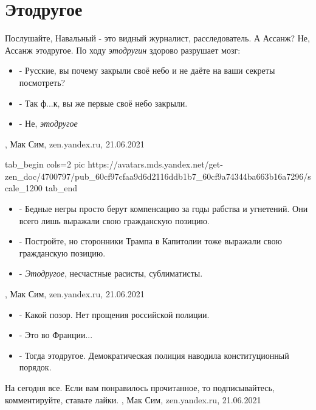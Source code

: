  
 
 
 
 
\chapter{Этодругое}
\label{sec:slova.etodrugoe}

Послушайте, Навальный - это видный журналист, расследователь. А Ассанж? Не, Ассанж этодругое.
По ходу \emph{этодругин} здорово разрушает мозг:
\begin{itemize}
  \item - Русские, вы почему закрыли своё небо и не даёте на ваши секреты посмотреть?
  \item - Так ф...к, вы же первые своё небо закрыли.
  \item - Не, \emph{этодругое}
\end{itemize}
 , 
 Мак Сим, zen.yandex.ru, 21.06.2021

 \ifcmt
   tab_begin cols=2
      pic https://avatars.mds.yandex.net/get-zen_doc/4700797/pub_60cf97cfaa9d6d2116ddb1b7_60cf9a74344ba663b16a7296/scale_1200
   tab_end
 \fi
\begin{itemize}
  \item - Бедные негры просто берут компенсацию за годы рабства и угнетений. Они всего лишь выражали свою гражданскую позицию.
  \item - Постройте, но сторонники Трампа в Капитолии тоже выражали свою гражданскую позицию.
  \item - \emph{Этодругое}, несчастные расисты, сублиматисты. 
\end{itemize}
 , 
 Мак Сим, zen.yandex.ru, 21.06.2021

\begin{itemize}
  \item - Какой позор. Нет прощения российской полиции.
  \item - Это во Франции...
  \item - Тогда этодругое. Демократическая полиция наводила конституционный порядок.
\end{itemize}
На сегодня все. Если вам понравилось прочитанное, то подписывайтесь, комментируйте, ставьте лайки. 
 , 
 Мак Сим, zen.yandex.ru, 21.06.2021

